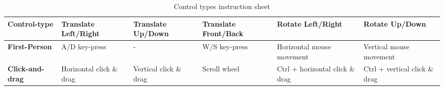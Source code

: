 \begin{table}[h]	
  \centering
	    \begin{tabular}{|p{2.5cm}|p{2.25cm}|p{2.25cm}|p{2.25cm}|p{2.25cm}|p{2.25cm}|}
  	    \hline	
  	    \textbf{Control-type} & \textbf{Translate Left/Right} & \textbf{Translate Up/Down} & \textbf{Translate Front/Back} & \textbf{Rotate Left/Right} & \textbf{Rotate Up/Down} \\
		\hline
		\textbf{First-Person} & A/D key-press & - & W/S key-press & Horizontal mouse movement & Vertical mouse movement \\
		\hline
		\textbf{Click-and-drag} & Horizontal click \& drag & Vertical click \& drag & Scroll wheel & Ctrl + horizontal click \& drag & Ctrl + vertical click \& drag\\
		\hline
		\end{tabular}
		\caption{Control types instruction sheet}
		\label{tab:control_types}
\end{table}

